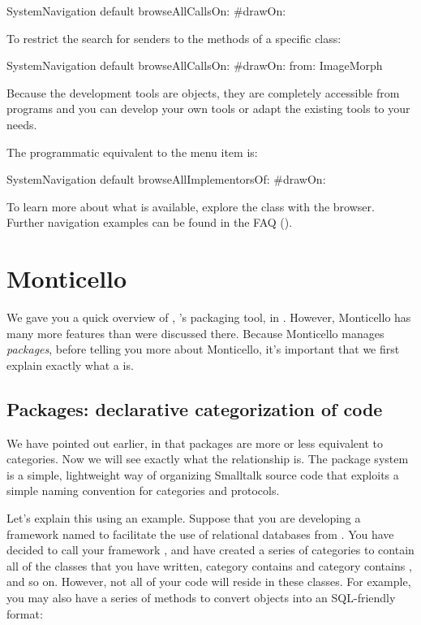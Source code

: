 \documentclass[a4paper,10pt,twoside]{book}
\begin{document}
\begin{code}{}
SystemNavigation default browseAllCallsOn: #drawOn:
\end{code}
To restrict the search for senders to the methods of a specific class:
\begin{code}{}
SystemNavigation default browseAllCallsOn: #drawOn: from: ImageMorph
\end{code}
Because the development tools are objects, they are completely accessible from programs and you can develop your own tools or adapt the existing tools to your needs.

The programmatic equivalent to the  menu item is:
\begin{code}{}
SystemNavigation default browseAllImplementorsOf: #drawOn:
\end{code}

To learn more about what is available, explore the class  with the browser.
Further navigation examples can be found in the FAQ ().

\section{Monticello}

We gave you a quick overview of , \pharo's packaging tool, in .  
However, Monticello has many more features than were discussed there.  
Because Monticello manages \emph{packages}, before telling you more about Monticello, it's important that we first explain exactly what a  is.

\subsection{Packages: declarative categorization of \pharo code}

We have pointed out earlier, in  that packages are more or less equivalent to categories. Now we will see exactly what the relationship is.
The package system is a simple, lightweight way of organizing Smalltalk source code that exploits a simple naming convention for categories and protocols.

Let's explain this using an example.
Suppose that you are developing a framework named to facilitate the use of relational databases from \pharo. You have decided to call your framework , and have created a series of categories to contain all of the classes that you have written, \eg
category  contains  and category  contains , and so on. However, not all of your code will reside in these classes. For example, you may also have a series of methods to convert objects into an SQL-friendly format:
\end{document}
